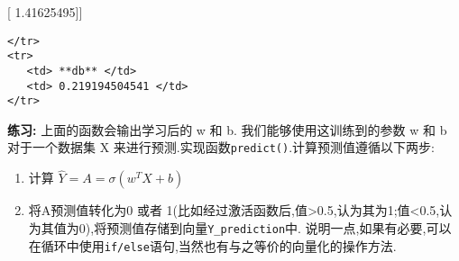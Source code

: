 \documentclass[11pt]{article}
\begin{document}
{[} 1.41625495{]}{]}

\begin{verbatim}
</tr>
<tr>
   <td> **db** </td>
   <td> 0.219194504541 </td>
</tr>
\end{verbatim}

    \textbf{练习:} 上面的函数会输出学习后的 w 和 b.
我们能够使用这训练到的参数 w 和 b 对于一个数据集 X
来进行预测.实现函数\texttt{predict()}.计算预测值遵循以下两步:

\begin{enumerate}
\def\labelenumi{\arabic{enumi}.}
\item
  计算 \(\hat{Y} = A = \sigma(w^T X + b)\)
\item
  将A预测值转化为0 或者
  1(比如经过激活函数后,值\textgreater{}0.5,认为其为1;值\textless{}0.5,认为其值为0),将预测值存储到向量\texttt{Y\_prediction}中.
  说明一点,如果有必要,可以在循环中使用\texttt{if/else}语句,当然也有与之等价的向量化的操作方法.
\end{enumerate}
\end{document}
